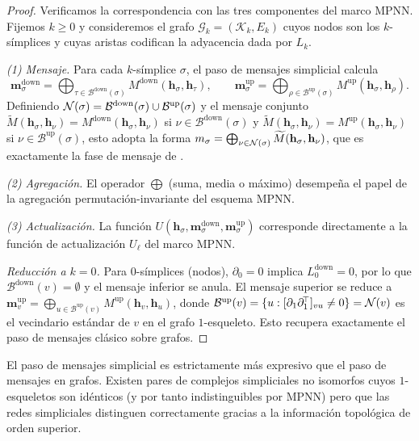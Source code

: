 \begin{proof}
Verificamos la correspondencia con las tres componentes del marco MPNN. Fijemos
$k \ge 0$ y consideremos el grafo $\mathcal{G}_k = (\mathcal{K}_k, E_k)$ cuyos
nodos son los $k$-s\'implices y cuyas aristas codifican la adyacencia dada por
$L_k$.

\emph{(1) Mensaje.} Para cada $k$-s\'implice $\sigma$, el paso de mensajes
simplicial calcula
\[
  \mathbf{m}_\sigma^{\mathrm{down}}
    = \bigoplus_{\tau \in \mathcal{B}^{\mathrm{down}}(\sigma)}
      M^{\mathrm{down}}(\mathbf{h}_\sigma, \mathbf{h}_\tau),
  \qquad
  \mathbf{m}_\sigma^{\mathrm{up}}
    = \bigoplus_{\rho \in \mathcal{B}^{\mathrm{up}}(\sigma)}
      M^{\mathrm{up}}(\mathbf{h}_\sigma, \mathbf{h}_\rho).
\]
Definiendo $\mathcal{N}(\sigma) = \mathcal{B}^{\mathrm{down}}(\sigma) \cup
\mathcal{B}^{\mathrm{up}}(\sigma)$ y el mensaje conjunto
$\widetilde{M}(\mathbf{h}_\sigma, \mathbf{h}_\nu) =
M^{\mathrm{down}}(\mathbf{h}_\sigma, \mathbf{h}_\nu)$ si
$\nu \in \mathcal{B}^{\mathrm{down}}(\sigma)$ y
$\widetilde{M}(\mathbf{h}_\sigma, \mathbf{h}_\nu) =
M^{\mathrm{up}}(\mathbf{h}_\sigma, \mathbf{h}_\nu)$ si
$\nu \in \mathcal{B}^{\mathrm{up}}(\sigma)$, esto adopta la forma
$m_\sigma = \bigoplus_{\nu \in \mathcal{N}(\sigma)} \widetilde{M}(\mathbf{h}_\sigma,
\mathbf{h}_\nu)$, que es exactamente la fase de mensaje de
.

\emph{(2) Agregaci\'on.} El operador $\bigoplus$ (suma, media o m\'aximo)
desempe\~na el papel de la agregaci\'on permutaci\'on-invariante del esquema MPNN.

\emph{(3) Actualizaci\'on.} La funci\'on
$U(\mathbf{h}_\sigma, \mathbf{m}_\sigma^{\mathrm{down}},
\mathbf{m}_\sigma^{\mathrm{up}})$ corresponde directamente a la funci\'on de
actualizaci\'on $U_\ell$ del marco MPNN.

\emph{Reducci\'on a $k = 0$.} Para $0$-s\'implices (nodos), $\partial_0 = 0$
implica $L_0^{\mathrm{down}} = 0$, por lo que $\mathcal{B}^{\mathrm{down}}(v) =
\emptyset$ y el mensaje inferior se anula. El mensaje superior se reduce a
$\mathbf{m}_v^{\mathrm{up}} = \bigoplus_{u \in \mathcal{B}^{\mathrm{up}}(v)}
M^{\mathrm{up}}(\mathbf{h}_v, \mathbf{h}_u)$, donde
$\mathcal{B}^{\mathrm{up}}(v) = \{u : [\partial_1 \partial_1^{\!\top}]_{vu} \neq 0\}
= \mathcal{N}(v)$ es el vecindario est\'andar de $v$ en el grafo $1$-esqueleto. Esto
recupera exactamente el paso de mensajes cl\'asico sobre grafos. \qedhere
\end{proof}

\begin{proposition}
\label{prop:priors:simplicial-expressivity}
El paso de mensajes simplicial es estrictamente m\'as expresivo que el paso de
mensajes en grafos. Existen pares de complejos simpliciales no isomorfos cuyos
$1$-esqueletos son id\'enticos (y por tanto indistinguibles por MPNN) pero que las
redes simpliciales distinguen correctamente gracias a la informaci\'on
topol\'ogica de orden superior.
\end{proposition}

